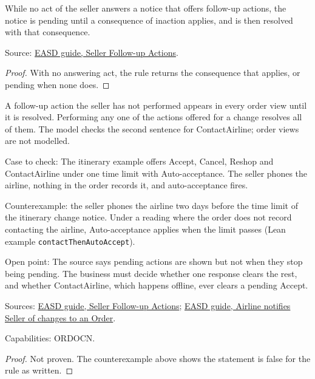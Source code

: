 \begin{theorem}
  \label{thm:airline-change-unanswered}
  While no act of the seller answers a notice that offers follow-up actions,
  the notice is pending until a consequence of inaction applies, and is then
  resolved with that consequence.

  Source: \href{https://standards.atlassian.net/wiki/spaces/EASD/pages/574849094}{EASD guide, Seller Follow-up Actions}.
\end{theorem}
\begin{proof}
  With no answering act, the rule returns the consequence that applies, or
  pending when none does.
\end{proof}

\begin{theorem}
  \label{thm:airline-change-pending-actions}
  A follow-up action the seller has not performed appears in every order
  view until it is resolved. Performing any one of the actions offered for a
  change resolves all of them.  The model checks the second sentence for
  ContactAirline; order views are not modelled.

  Case to check: The itinerary example offers Accept, Cancel, Reshop and
  ContactAirline under one time limit with Auto-acceptance. The seller
  phones the airline, nothing in the order records it, and auto-acceptance
  fires.

  Counterexample: the seller phones the airline two days before the time
  limit of the itinerary change notice.  Under a reading where the order does
  not record contacting the airline, Auto-acceptance applies when the limit
  passes (Lean example \texttt{contactThenAutoAccept}).

  Open point: The source says pending actions are shown but not when they
  stop being pending. The business must decide whether one response clears
  the rest, and whether ContactAirline, which happens offline, ever clears a
  pending Accept.

  Sources: \href{https://standards.atlassian.net/wiki/spaces/EASD/pages/574849094}{EASD guide, Seller Follow-up Actions};
  \href{https://standards.atlassian.net/wiki/spaces/EASD/pages/815202352}{EASD guide, Airline notifies Seller of changes to an Order}.

  Capabilities: ORDOCN.
\end{theorem}
\begin{proof}
  Not proven.  The counterexample above shows the statement is false for the
  rule as written.
\end{proof}

